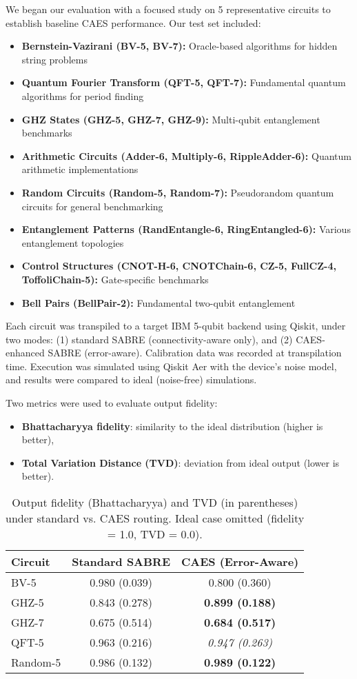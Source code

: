 \documentclass[conference]{IEEEtran}
\begin{document}
We began our evaluation with a focused study on 5 representative circuits to establish baseline CAES performance. Our test set included:
\begin{itemize}
    \item \textbf{Bernstein-Vazirani (BV-5, BV-7):} Oracle-based algorithms for hidden string problems
    \item \textbf{Quantum Fourier Transform (QFT-5, QFT-7):} Fundamental quantum algorithms for period finding
    \item \textbf{GHZ States (GHZ-5, GHZ-7, GHZ-9):} Multi-qubit entanglement benchmarks
    \item \textbf{Arithmetic Circuits (Adder-6, Multiply-6, RippleAdder-6):} Quantum arithmetic implementations
    \item \textbf{Random Circuits (Random-5, Random-7):} Pseudorandom quantum circuits for general benchmarking
    \item \textbf{Entanglement Patterns (RandEntangle-6, RingEntangled-6):} Various entanglement topologies
    \item \textbf{Control Structures (CNOT-H-6, CNOTChain-6, CZ-5, FullCZ-4, ToffoliChain-5):} Gate-specific benchmarks
    \item \textbf{Bell Pairs (BellPair-2):} Fundamental two-qubit entanglement
\end{itemize}

Each circuit was transpiled to a target IBM 5-qubit backend using Qiskit, under two modes: (1) standard SABRE (connectivity-aware only), and (2) CAES-enhanced SABRE (error-aware). Calibration data was recorded at transpilation time. Execution was simulated using Qiskit Aer with the device’s noise model, and results were compared to ideal (noise-free) simulations.

Two metrics were used to evaluate output fidelity:
\begin{itemize}
    \item \textbf{Bhattacharyya fidelity}: similarity to the ideal distribution (higher is better),
    \item \textbf{Total Variation Distance (TVD)}: deviation from ideal output (lower is better).
\end{itemize}

\begin{table}[h]
\caption{Output fidelity (Bhattacharyya) and TVD (in parentheses) under standard vs. CAES routing. Ideal case omitted (fidelity = 1.0, TVD = 0.0).}
\label{tab:results}
\centering
\begin{tabular}{lcc}
\hline\hline
\textbf{Circuit} & \textbf{Standard SABRE} & \textbf{CAES (Error-Aware)} \\
\hline
BV-5 & 0.980 (0.039) & 0.800 (0.360) \\
GHZ-5 & 0.843 (0.278) & \textbf{0.899 (0.188)} \\
GHZ-7 & 0.675 (0.514) & \textbf{0.684 (0.517) }\\
QFT-5 & 0.963 (0.216) & \textit{0.947 (0.263)} \\
Random-5 & 0.986 (0.132) & \textbf{0.989 (0.122)} \\
\hline\hline
\end{tabular}
\end{table}
\end{document}
